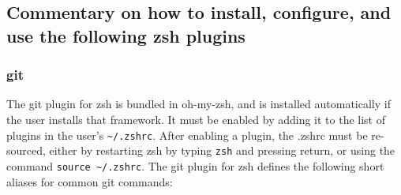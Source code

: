 \documentclass[12pt,a4paper]{article}
\begin{document}
		\subsection{Commentary on how to install, configure, and use the following zsh plugins}

			\subsubsection{git}

				The git plugin for zsh is bundled in oh-my-zsh, and is installed automatically if the user installs that framework. It must be enabled by adding it to the list of plugins in the user's \verb$~/.zshrc$. After enabling a plugin, the .zshrc must be re-sourced, either by restarting zsh by typing \lstinline{zsh} and pressing return, or using the command \verb$source ~/.zshrc$. The git plugin for zsh defines the following short aliases for common git commands:
\end{document}
